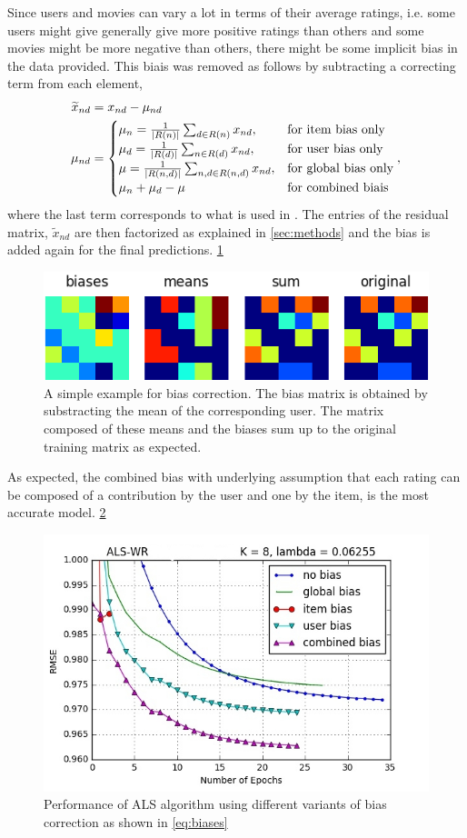 Since users and movies can vary a lot in terms of their average ratings, i.e. some
users might give generally give more positive ratings than others and some
movies might be more negative than others, there might be some implicit bias in
the data provided. 
This biais was removed as follows by subtracting a correcting term from each
element,
\begin{align}
  \widetilde{x}_{nd} &= x_{nd}-\mu_{nd} \\
  \mu_{nd} &=
 \begin{cases}
  \mu_{n} = \inv{|R(n)|} \sum_{d \in R(n)} x_{nd}, &\text{for item bias only}   \\
\mu_{d} = \inv{|R(d)|} \sum_{n \in R(d)} x_{nd}, &\text{for user bias only} \\
\mu = \inv{|R(n,d)|}\sum_{n,d \in R(n,d)} x_{nd}, &\text{for global bias only}
   \\
  \mu_{n} + \mu_{d} - \mu &\text{for combined biais}
 \end{cases}, 
  \label{eq:biases}
\end{align}
where the last term corresponds to what is used in \cite{Koren2009}. 
The entries of the residual matrix, $\widetilde{x}_{nd}$ are then factorized as explained
in \ref{sec:methods} and the bias is added again for the final predictions.
\ref{fig:matrix}

\begin{figure}[htbp]
  \centering
  \includegraphics[width=.7\columnwidth]{figures/biases_user.png}
  \caption{A simple example for bias correction. The bias matrix is obtained by
  substracting the mean of the corresponding user. The matrix composed of these
  means and the biases sum up to the original training matrix as expected.}
  \label{fig:matrix}
\end{figure}

As expected, the combined bias with underlying assumption that each rating can
be composed of a contribution by the user and one by the item, is the most
accurate model. \ref{fig:bias} 

\begin{figure}[htbp]
  \centering
  \includegraphics[width=.7\columnwidth]{figures/bias.jpg}
  \vspace{-3mm}
  \caption{Performance of ALS algorithm using different variants of bias
  correction as shown in \eqref{eq:biases}}
  \label{fig:bias}
\end{figure}
